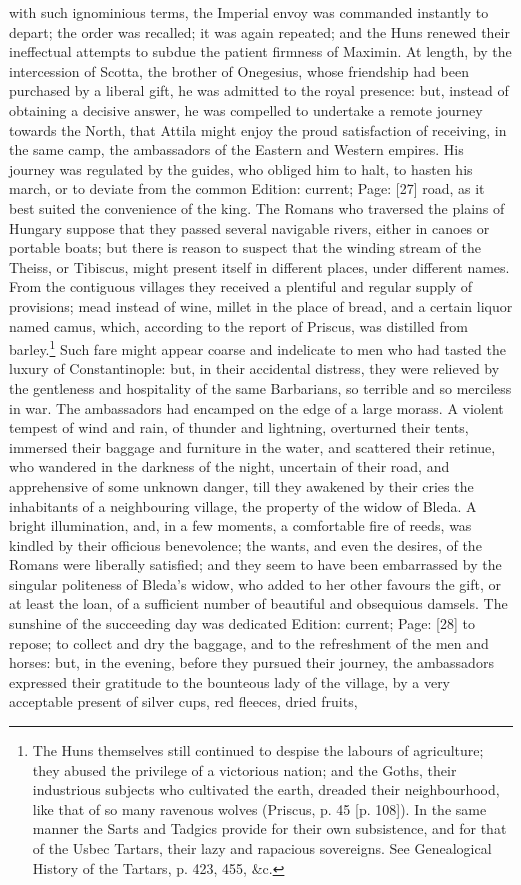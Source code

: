 with such ignominious terms, the Imperial envoy was commanded instantly to depart; the order was recalled; it was again repeated; and the Huns renewed their ineffectual attempts to subdue the patient firmness of Maximin. At length, by the intercession of Scotta, the brother of Onegesius, whose friendship had been purchased by a liberal gift, he was admitted to the royal presence: but, instead of obtaining a decisive answer, he was compelled to undertake a remote journey towards the North, that Attila might enjoy the proud satisfaction of receiving, in the same camp, the ambassadors of the Eastern and Western empires. His journey was regulated by the guides, who obliged him to halt, to hasten his march, or to deviate from the common Edition: current; Page: [27] road, as it best suited the convenience of the king. The Romans who traversed the plains of Hungary suppose that they passed several navigable rivers, either in canoes or portable boats; but there is reason to suspect that the winding stream of the Theiss, or Tibiscus, might present itself in different places, under different names. From the contiguous villages they received a plentiful and regular supply of provisions; mead instead of wine, millet in the place of bread, and a certain liquor named camus, which, according to the report of Priscus, was distilled from barley.\footnote{The Huns themselves still continued to despise the labours of agriculture; they abused the privilege of a victorious nation; and the Goths, their industrious subjects who cultivated the earth, dreaded their neighbourhood, like that of so many ravenous wolves (Priscus, p. 45 [p. 108]). In the same manner the Sarts and Tadgics provide for their own subsistence, and for that of the Usbec Tartars, their lazy and rapacious sovereigns. See Genealogical History of the Tartars, p. 423, 455, \&c.} Such fare might appear coarse and indelicate to men who had tasted the luxury of Constantinople: but, in their accidental distress, they were relieved by the gentleness and hospitality of the same Barbarians, so terrible and so merciless in war. The ambassadors had encamped on the edge of a large morass. A violent tempest of wind and rain, of thunder and lightning, overturned their tents, immersed their baggage and furniture in the water, and scattered their retinue, who wandered in the darkness of the night, uncertain of their road, and apprehensive of some unknown danger, till they awakened by their cries the inhabitants of a neighbouring village, the property of the widow of Bleda. A bright illumination, and, in a few moments, a comfortable fire of reeds, was kindled by their officious benevolence; the wants, and even the desires, of the Romans were liberally satisfied; and they seem to have been embarrassed by the singular politeness of Bleda\texthebrew{}’s widow, who added to her other favours the gift, or at least the loan, of a sufficient number of beautiful and obsequious damsels. The sunshine of the succeeding day was dedicated Edition: current; Page: [28] to repose; to collect and dry the baggage, and to the refreshment of the men and horses: but, in the evening, before they pursued their journey, the ambassadors expressed their gratitude to the bounteous lady of the village, by a very acceptable present of silver cups, red fleeces, dried fruits, 
